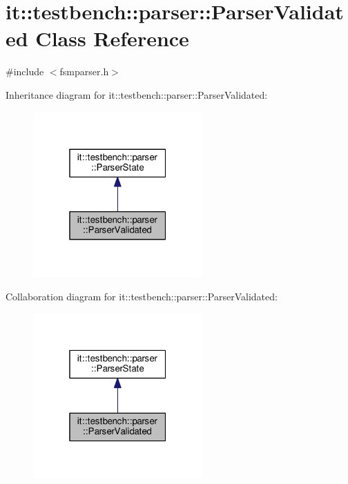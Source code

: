 \hypertarget{classit_1_1testbench_1_1parser_1_1ParserValidated}{\section{it\-:\-:testbench\-:\-:parser\-:\-:Parser\-Validated Class Reference}
\label{d2/dbf/classit_1_1testbench_1_1parser_1_1ParserValidated}
}


{\ttfamily \#include $<$fsmparser.\-h$>$}



Inheritance diagram for it\-:\-:testbench\-:\-:parser\-:\-:Parser\-Validated\-:
\nopagebreak
\begin{figure}[H]
\begin{center}
\leavevmode
\includegraphics[width=184pt]{d4/d87/classit_1_1testbench_1_1parser_1_1ParserValidated__inherit__graph}
\end{center}
\end{figure}


Collaboration diagram for it\-:\-:testbench\-:\-:parser\-:\-:Parser\-Validated\-:
\nopagebreak
\begin{figure}[H]
\begin{center}
\leavevmode
\includegraphics[width=184pt]{df/dff/classit_1_1testbench_1_1parser_1_1ParserValidated__coll__graph}
\end{center}
\end{figure}
